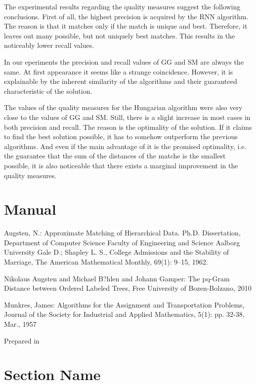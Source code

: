\documentclass[a4paper,11pt]{article}
\begin{document}
The experimental results regarding the quality measures suggest the following conclusions. First of all, the highest precision is acquired by the RNN algorithm. The reason is that it matches only if the match is unique and best. Therefore, it leaves out many possible, but not uniquely best matches. This results in the noticeably lower recall values.

In our eperiments the precision and recall values of GG and SM are always the same. At first appearance it seems like a strange coincidence. However, it is explainable by the inherent similarity of the algorithms and their guaranteed characteristic of the solution.

The values of the quality measures for the Hungarian algorithm were also very close to the values of GG and SM. Still, there is a slight increase in most cases in both precision and recall. The reason is the optimality of the solution. If it claims to find the best solution possible, it has to somehow outperform the previous algorithms. And even if the main advantage of it is the promised optimality, i.e. the guarantee that the sum of the distances of the matche is the smallest possible, it is also noticeable that there exists a marginal improvement in the quality measures.

\section{Manual}


\begin{thebibliography}{9999}
Augsten, N.: Approximate Matching of Hierarchical Data. 
Ph.D. Dissertation, Department of Computer Science Faculty of Engineering and Science Aalborg University
Gale D.; Shapley L. S., College Admissions and the Stability of Marriage, The American Mathematical Monthly,  69(1): 9–15, 1962.

Nikolaus Augsten and Michael B?hlen and Johann Gamper: The pq-Gram Distance between Ordered Labeled Trees, Free University of Bozen-Bolzano, 2010 

Munkres, James: Algorithms for the Assignment and Transportation Problems, Journal of the Society for Industrial and Applied Mathematics, 5(1): pp. 32-38, Mar., 1957

\end{thebibliography}
\vfill
\begin{flushright}\small Prepared in \LaTeXe\ \end{flushright}

\appendix
\section{Section Name}
\end{document}
